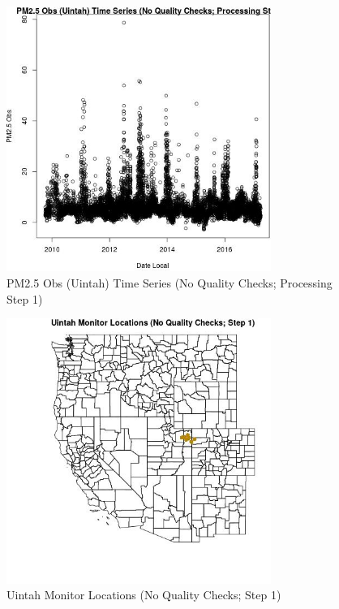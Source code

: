 
\begin{figure} 
\centering  
\includegraphics[width=0.77\textwidth]{Code_Outputs/PM25Source3TSstep1_PM25_ObsvDate_Local.jpg} 
\caption{\label{fig:PM25Source3TSstep1PM25_ObsvDate_Local}PM2.5 Obs (Uintah) Time Series (No Quality Checks; Processing Step 1)} 
\end{figure} 
 

\begin{figure} 
\centering  
\includegraphics[width=0.77\textwidth]{Code_Outputs/PM25Source3TSstep1_MapUintahLocations.jpg} 
\caption{\label{fig:PM25Source3TSstep1MapUintahLocations}Uintah Monitor Locations (No Quality Checks; Step 1)} 
\end{figure} 
 
